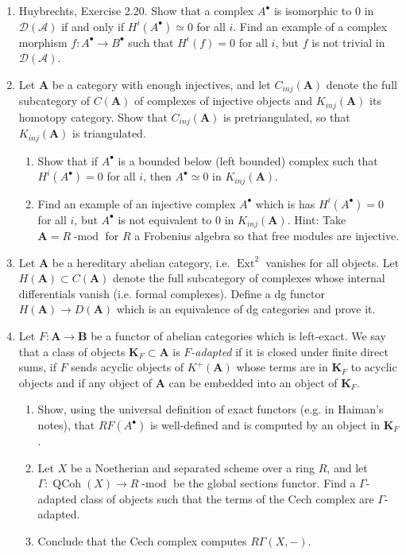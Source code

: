 \documentclass[10pt]{article}
\theoremstyle{definition}
\DeclareMathOperator{\Ext}{Ext}
\DeclareMathOperator{\dmod}{-mod}
\DeclareMathOperator{\QCoh}{QCoh}
\newcommand{\cat}{\mathbf}
\begin{document}
\begin{enumerate}
\item Huybrechts, Exercise 2.20.  Show that a complex $A^\bullet$ is isomorphic to $0$ in $\mathcal{D}(\mathcal{A})$ if and only if $H^i(A^\bullet) \simeq 0$ for all $i$.  Find an example of a complex morphism $f: A^\bullet \rightarrow B^\bullet$ such that $H^i(f) = 0$ for all $i$, but $f$ is not trivial in $\mathcal{D}(\mathcal{A})$.
\item Let $\cat{A}$ be a category with enough injectives, and let $C_{inj}(\cat{A})$ denote the full subcategory of $C(\cat{A})$ of complexes of injective objects and $K_{inj}(\cat{A})$ its homotopy category.  Show that $C_{inj}(\cat{A})$ is pretriangulated, so that $K_{inj}(\cat{A})$ is triangulated.
\begin{enumerate}
\item Show that if $A^\bullet$ is a bounded below (left bounded) complex such that $H^i(A^\bullet) = 0$ for all $i$, then $A^\bullet \simeq 0$ in $K_{inj}(\cat{A})$.
\item Find an example of an injective complex $A^\bullet$ which is has $H^i(A^\bullet) = 0$ for all $i$, but $A^\bullet$ is not equivalent to 0 in $K_{inj}(\cat{A})$.  Hint: Take $\cat{A} = R\dmod$ for $R$ a Frobenius algebra so that free modules are injective.
\end{enumerate}
\item Let $\cat{A}$ be a hereditary abelian category, i.e. $\Ext^2$ vanishes for all objects.  Let $H(\cat{A}) \subset C(\cat{A})$ denote the full subcategory of complexes whose internal differentials vanish (i.e. formal complexes).  Define a dg functor $H(\cat{A}) \rightarrow D(\cat{A})$ which is an equivalence of dg categories and prove it.
\item Let $F: \cat{A} \rightarrow \cat{B}$ be a functor of abelian categories which is left-exact.  We say that a class of objects $\cat{K}_F \subset \cat{A}$ is \emph{$F$-adapted} if it is closed under finite direct sums, if $F$ sends acyclic objects of $K^+(\cat{A})$ whose terms are in $\cat{K}_F$ to acyclic objects and if any object of $\cat{A}$ can be embedded into an object of $\cat{K}_F$. 
\begin{enumerate}
\item Show, using the universal definition of exact functors (e.g. in Haiman's notes), that $RF(A^\bullet)$ is well-defined and is computed by an object in $\cat{K}_F$.
\item Let $X$ be a Noetherian and separated scheme over a ring $R$, and let $\Gamma: \QCoh(X) \rightarrow R\dmod$ be the global sections functor.  Find a $\Gamma$-adapted class of objects such that the terms of the Cech complex are $\Gamma$-adapted.
\item Conclude that the Cech complex computes $R\Gamma(X, -)$.
\end{enumerate}
\end{enumerate}
\end{document}
